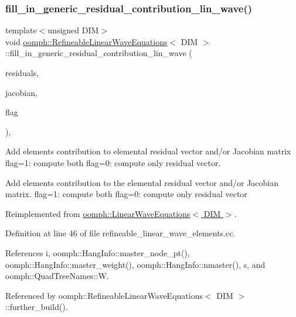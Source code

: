 \subsubsection{\texorpdfstring{fill\+\_\+in\+\_\+generic\+\_\+residual\+\_\+contribution\+\_\+lin\+\_\+wave()}{fill\_in\_generic\_residual\_contribution\_lin\_wave()}}
{\footnotesize\ttfamily template$<$unsigned D\+IM$>$ \\
void \hyperlink{classoomph_1_1RefineableLinearWaveEquations}{oomph\+::\+Refineable\+Linear\+Wave\+Equations}$<$ D\+IM $>$\+::fill\+\_\+in\+\_\+generic\+\_\+residual\+\_\+contribution\+\_\+lin\+\_\+wave (\begin{DoxyParamCaption}\item[{\hyperlink{classoomph_1_1Vector}{Vector}$<$ double $>$ \&}]{residuals,  }\item[{\hyperlink{classoomph_1_1DenseMatrix}{Dense\+Matrix}$<$ double $>$ \&}]{jacobian,  }\item[{unsigned}]{flag }\end{DoxyParamCaption})\hspace{0.3cm}{\ttfamily [private]}, {\ttfamily [virtual]}}



Add element\textquotesingle{}s contribution to elemental residual vector and/or Jacobian matrix flag=1\+: compute both flag=0\+: compute only residual vector. 

Add element\textquotesingle{}s contribution to the elemental residual vector and/or Jacobian matrix. flag=1\+: compute both flag=0\+: compute only residual vector 

Reimplemented from \hyperlink{classoomph_1_1LinearWaveEquations_ae6017a229d5eccb3fb342e34a10382ec}{oomph\+::\+Linear\+Wave\+Equations$<$ D\+I\+M $>$}.



Definition at line 46 of file refineable\+\_\+linear\+\_\+wave\+\_\+elements.\+cc.



References i, oomph\+::\+Hang\+Info\+::master\+\_\+node\+\_\+pt(), oomph\+::\+Hang\+Info\+::master\+\_\+weight(), oomph\+::\+Hang\+Info\+::nmaster(), s, and oomph\+::\+Quad\+Tree\+Names\+::W.



Referenced by oomph\+::\+Refineable\+Linear\+Wave\+Equations$<$ D\+I\+M $>$\+::further\+\_\+build().

\mbox{\label{classoomph_1_1RefineableLinearWaveEquations_ad737613ce4a9b64210bf55230d0dcf47}} 
